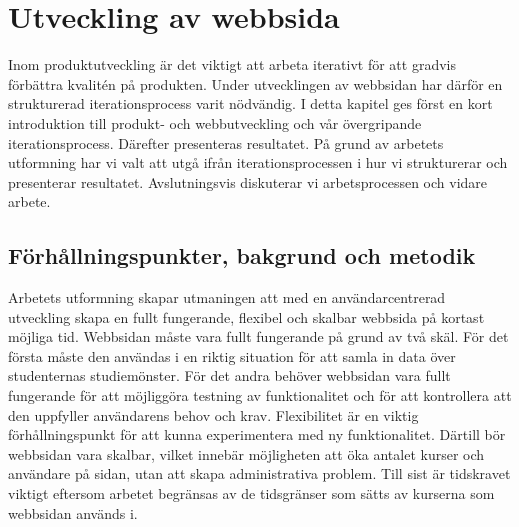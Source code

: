 \chapter{Utveckling av webbsida}
\label{sec: webb}

Inom produktutveckling är det viktigt att arbeta iterativt för att gradvis förbättra kvalitén på produkten. Under utvecklingen av webbsidan har därför en strukturerad iterationsprocess varit nödvändig. I detta kapitel ges först en kort introduktion till produkt- och webbutveckling och vår övergripande iterationsprocess. Därefter presenteras resultatet. På grund av arbetets utformning har vi valt att utgå ifrån iterationsprocessen i hur vi strukturerar och presenterar resultatet. Avslutningsvis diskuterar vi arbetsprocessen och vidare arbete. 


\section{Förhållningspunkter, bakgrund och metodik}
Arbetets utformning skapar utmaningen att med en användarcentrerad utveckling skapa en fullt fungerande, flexibel och skalbar webbsida på kortast möjliga tid. Webbsidan måste vara fullt fungerande på grund av två skäl. För det första måste den användas i en riktig situation för att samla in data över studenternas studiemönster. För det andra behöver webbsidan vara fullt fungerande för att möjliggöra testning av funktionalitet och för att kontrollera att den uppfyller användarens behov och krav. Flexibilitet är en viktig förhållningspunkt för att kunna experimentera med ny funktionalitet. Därtill bör webbsidan vara skalbar, vilket innebär möjligheten att öka antalet kurser och användare på sidan, utan att skapa administrativa problem. Till sist är tidskravet viktigt eftersom arbetet begränsas av de tidsgränser som sätts av kurserna som webbsidan används i.


